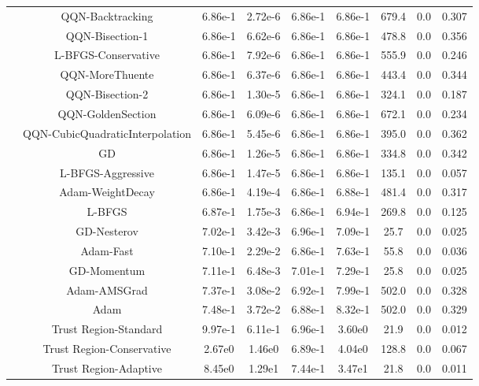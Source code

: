\documentclass[11pt]{article}
\begin{document}
{\begin{longtable}{l*{8}{S[table-format=2.2e-1]}}
 & QQN-Backtracking & 6.86e-1 & 2.72e-6 & 6.86e-1 & 6.86e-1 & 679.4 & 0.0 & 0.307 \\
 & QQN-Bisection-1 & 6.86e-1 & 6.62e-6 & 6.86e-1 & 6.86e-1 & 478.8 & 0.0 & 0.356 \\
 & L-BFGS-Conservative & 6.86e-1 & 7.92e-6 & 6.86e-1 & 6.86e-1 & 555.9 & 0.0 & 0.246 \\
 & QQN-MoreThuente & 6.86e-1 & 6.37e-6 & 6.86e-1 & 6.86e-1 & 443.4 & 0.0 & 0.344 \\
 & QQN-Bisection-2 & 6.86e-1 & 1.30e-5 & 6.86e-1 & 6.86e-1 & 324.1 & 0.0 & 0.187 \\
 & QQN-GoldenSection & 6.86e-1 & 6.09e-6 & 6.86e-1 & 6.86e-1 & 672.1 & 0.0 & 0.234 \\
 & QQN-CubicQuadraticInterpolation & 6.86e-1 & 5.45e-6 & 6.86e-1 & 6.86e-1 & 395.0 & 0.0 & 0.362 \\
 & GD & 6.86e-1 & 1.26e-5 & 6.86e-1 & 6.86e-1 & 334.8 & 0.0 & 0.342 \\
 & L-BFGS-Aggressive & 6.86e-1 & 1.47e-5 & 6.86e-1 & 6.86e-1 & 135.1 & 0.0 & 0.057 \\
 & Adam-WeightDecay & 6.86e-1 & 4.19e-4 & 6.86e-1 & 6.88e-1 & 481.4 & 0.0 & 0.317 \\
 & L-BFGS & 6.87e-1 & 1.75e-3 & 6.86e-1 & 6.94e-1 & 269.8 & 0.0 & 0.125 \\
 & GD-Nesterov & 7.02e-1 & 3.42e-3 & 6.96e-1 & 7.09e-1 & 25.7 & 0.0 & 0.025 \\
 & Adam-Fast & 7.10e-1 & 2.29e-2 & 6.86e-1 & 7.63e-1 & 55.8 & 0.0 & 0.036 \\
 & GD-Momentum & 7.11e-1 & 6.48e-3 & 7.01e-1 & 7.29e-1 & 25.8 & 0.0 & 0.025 \\
 & Adam-AMSGrad & 7.37e-1 & 3.08e-2 & 6.92e-1 & 7.99e-1 & 502.0 & 0.0 & 0.328 \\
 & Adam & 7.48e-1 & 3.72e-2 & 6.88e-1 & 8.32e-1 & 502.0 & 0.0 & 0.329 \\
 & Trust Region-Standard & 9.97e-1 & 6.11e-1 & 6.96e-1 & 3.60e0 & 21.9 & 0.0 & 0.012 \\
 & Trust Region-Conservative & 2.67e0 & 1.46e0 & 6.89e-1 & 4.04e0 & 128.8 & 0.0 & 0.067 \\
 & Trust Region-Adaptive & 8.45e0 & 1.29e1 & 7.44e-1 & 3.47e1 & 21.8 & 0.0 & 0.011 \\
\midrule
\end{longtable}
}
\end{document}
